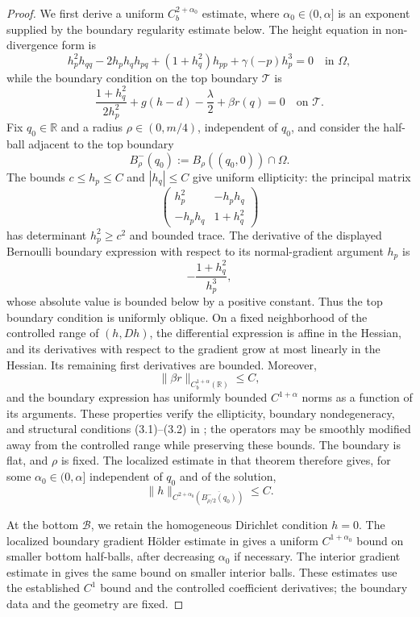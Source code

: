 \documentclass[12pt,letterpaper]{amsart}
\numberwithin{equation}{section}
\def\R{{\mathbb R}}
\begin{document}
\begin{proof}
	
	{We first derive a uniform $C_b^{2+\alpha_0}$ estimate, where $\alpha_0\in(0,\alpha]$ is an exponent supplied by the boundary regularity estimate below.} The height equation in non-divergence form \cite{constantincpam04} is
	\[
h_p^2 h_{qq} - 2h_p h_q h_{pq} + (1 + h_q^2) h_{pp} + \gamma(-p) h_p^3 = 0 \quad \text{in } \Omega,
\]
while the boundary condition on the top boundary $\mathcal T$ is
\[
\frac{1 + h_q^2}{2h_p^2} + g(h - d) - \frac{\lambda}{2} + \beta r(q) = 0 \quad \text{on } \mathcal T.
\]
Fix \( q_0 \in \mathbb{R} \) and a radius \( \rho \in (0, m/4) \), independent of \( q_0 \), and {consider the half-ball adjacent to the top boundary}
\[
B_\rho^- (q_0) := B_\rho ((q_0, 0)) \cap \Omega.
\]
The bounds $c\leq h_p\leq C$ and $|h_q|\leq C$ give uniform ellipticity: the principal matrix
\[
\begin{pmatrix}
h_p^2&-h_ph_q\\
-h_ph_q&1+h_q^2
\end{pmatrix}
\]
has determinant $h_p^2\geq c^2$ and bounded trace. The derivative of the displayed Bernoulli boundary expression with respect to its normal-gradient argument $h_p$ is
\[
-\frac{1+h_q^2}{h_p^3},
\]
whose absolute value is bounded below by a positive constant. Thus the top boundary condition is uniformly oblique. On a fixed neighborhood of the controlled range of $(h,Dh)$, the differential expression is affine in the Hessian, and its derivatives with respect to the gradient grow at most linearly in the Hessian. Its remaining first derivatives are bounded. Moreover,
\[\|\beta r\|_{C_b^{1+\alpha}(\R)}\leq C,\]
and the boundary expression has uniformly bounded $C^{1+\alpha}$ norms as a function of its arguments. These properties verify the ellipticity, boundary nondegeneracy, and structural conditions (3.1)--(3.2) in \cite[Theorem 3]{lieberman87}; the operators may be smoothly modified away from the controlled range while preserving these bounds. The boundary is flat, and $\rho$ is fixed. The localized estimate in that theorem therefore gives, for some $\alpha_0\in(0,\alpha]$ independent of $q_0$ and of the solution,
\begin{equation*}
\|h\|_{C^{2+\alpha_0}(\overline{B_{\rho/2}^-(q_0)})} \leq C.
\end{equation*}

At the bottom $\mathcal B$, we retain the homogeneous Dirichlet condition $h=0$. The localized boundary gradient H\"older estimate in \cite[Theorem 13.7 and (13.41)]{Ts} gives a uniform $C^{1+\alpha_0}$ bound on smaller bottom half-balls, after decreasing $\alpha_0$ if necessary. The interior gradient estimate in \cite[Theorem 13.6]{Ts} gives the same bound on smaller interior balls. These estimates use the established $C^1$ bound and the controlled coefficient derivatives; the boundary data and the geometry are fixed.


\end{proof}
\end{document}
